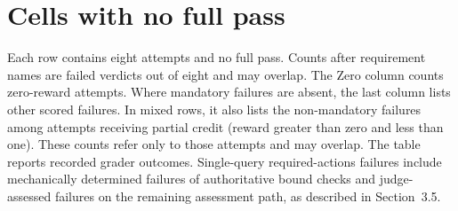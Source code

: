 \section{Cells with no full pass}\label{app:zero-diagnostics}
Each row contains eight attempts and no full pass. Counts after requirement names are failed verdicts out of eight and may overlap. The Zero column counts zero-reward attempts. Where mandatory failures are absent, the last column lists other scored failures. In mixed rows, it also lists the non-mandatory failures among attempts receiving partial credit (reward greater than zero and less than one). These counts refer only to those attempts and may overlap. The table reports recorded grader outcomes. Single-query required-actions failures include mechanically determined failures of authoritative bound checks and judge-assessed failures on the remaining assessment path, as described in Section~3.5.

